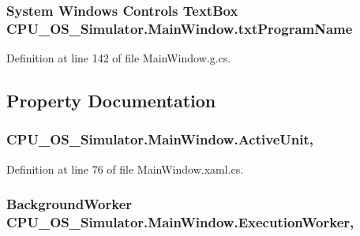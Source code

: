 \subsubsection[{txt\+Program\+Name}]{\setlength{\rightskip}{0pt plus 5cm}System Windows Controls Text\+Box C\+P\+U\+\_\+\+O\+S\+\_\+\+Simulator.\+Main\+Window.\+txt\+Program\+Name\hspace{0.3cm}{\ttfamily [package]}}\label{class_c_p_u___o_s___simulator_1_1_main_window_a2c64b45db8c1d7a30c2f9155899cf918}


Definition at line 142 of file Main\+Window.\+g.\+cs.



\subsection{Property Documentation}
\hypertarget{class_c_p_u___o_s___simulator_1_1_main_window_a3d03550a73d7ab18ebd143a38dbf1431}{}
\subsubsection[{Active\+Unit}]{ C\+P\+U\+\_\+\+O\+S\+\_\+\+Simulator.\+Main\+Window.\+Active\+Unit\hspace{0.3cm}{\ttfamily [get]}, {\ttfamily [set]}}\label{class_c_p_u___o_s___simulator_1_1_main_window_a3d03550a73d7ab18ebd143a38dbf1431}


Definition at line 76 of file Main\+Window.\+xaml.\+cs.

\hypertarget{class_c_p_u___o_s___simulator_1_1_main_window_aab5d6c95426ebe1e75b7c3bfc0488b84}{}
\subsubsection[{Execution\+Worker}]{\setlength{\rightskip}{0pt plus 5cm}Background\+Worker C\+P\+U\+\_\+\+O\+S\+\_\+\+Simulator.\+Main\+Window.\+Execution\+Worker\hspace{0.3cm}{\ttfamily [get]}, {\ttfamily [set]}}\label{class_c_p_u___o_s___simulator_1_1_main_window_aab5d6c95426ebe1e75b7c3bfc0488b84}


